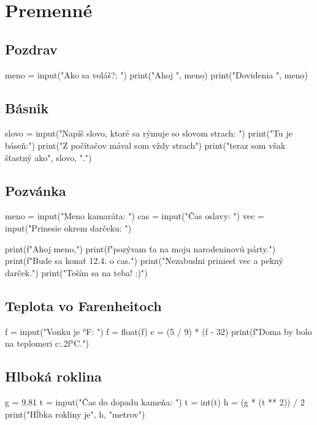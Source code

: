\section{Premenné}
\subsection{Pozdrav}
\begin{solution}
meno = input("Ako sa voláš?: ")
print("Ahoj ", meno)
print("Dovidenia ", meno)
\end{solution}

\subsection{Básnik}
\begin{solution}
slovo = input("Napíš slovo, ktoré sa rýmuje so slovom strach: ")
print("Tu je báseň:")
print("Z počítačov mával som vždy strach")
print("teraz som však šťastný ako", slovo, ".")
\end{solution}

\subsection{Pozvánka}
\begin{solution}
meno = input("Meno kamaráta: ")
cas = input("Čas oslavy: ")
vec = input("Prinesie okrem darčeku: ")

print(f"Ahoj {meno},")
print(f"pozývam ťa na moju narodeninovú párty.")
print(f"Bude sa konať 12.4. o {cas}.")
print("Nezabudni priniesť {vec} a pekný darček.")
print("Teším sa na teba! :)")
\end{solution}

\subsection{Teplota vo Farenheitoch}
\begin{solution}
f = input("Vonku je °F: ")
f = float(f)
c = (5 / 9) * (f - 32)
print(f"Doma by bolo na teplomeri {c:.2f}°C.")
\end{solution}

\subsection{Hlboká roklina}
\begin{solution}
g = 9.81
t = input("Čas do dopadu kameňa: ")
t = int(t)
h = (g * (t ** 2)) / 2
print("Hĺbka rokliny je", h, "metrov")
\end{solution}

